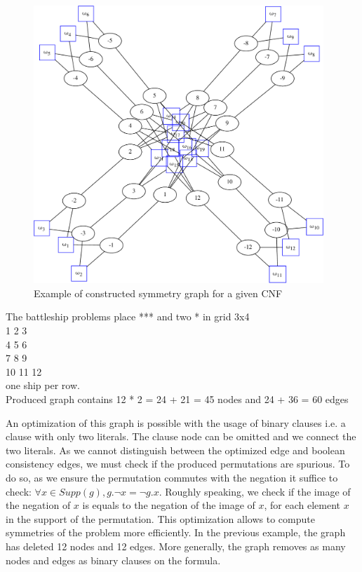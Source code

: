 \begin{figure}[h!]
	\begin{minipage}[c]{.2\textwidth}
		
	\end{minipage}
	\begin{minipage}[l]{.75\textwidth}
		\includegraphics[width=4.3in]{cnfs/graph_cnf_no_opt-crop}
	\end{minipage}
\caption{Example of constructed symmetry graph for a given CNF}
\end{figure}


The battleship problems place *** and two * in grid 3x4 \\
1  2  3\\
4  5  6\\
7  8  9\\
10 11 12\\

one ship per row.\\

Produced graph contains 12 * 2 = 24  + 21 = 45 nodes and 24 + 36 = 60 edges 

\clearpage

An optimization of this graph is possible with the usage of binary clauses i.e. a clause with only two literals.
The clause node can be omitted and we connect the two literals. As we cannot distinguish between the optimized edge 
and boolean consistency edges, we must check if the produced permutations are spurious. 
To do so, as we ensure the permutation commutes with the negation it suffice to check:
$\forall x \in Supp(g), g.\neg x = \neg g.x$.
Roughly speaking, we check if the image of the negation of $x$ is equals to the negation of the image of $x$, for each element $x$ in the support of the permutation.
This optimization allows to compute symmetries of the problem more efficiently.
In the previous example, the graph has deleted 12 nodes and 12 edges. More generally,
the graph removes as many nodes and edges as binary clauses on the formula.

